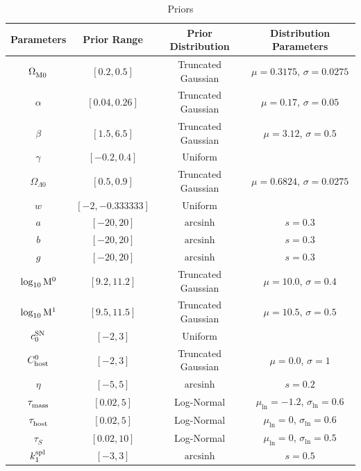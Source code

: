 \begin{table}
    \caption{Priors}
    \label{tab:priors}
    \centering
    \begin{tabular}{cccc}
        \hline
        \hline
        Parameters & Prior Range & Prior Distribution & Distribution Parameters \\
        \hline
        \hline
        $\Omega_{\rm M0}^{}$ & $[0.2, 0.5]$ & Truncated Gaussian & $\mu = 0.3175$, $\sigma = 0.0275$ \\
        $\alpha$ & $[0.04, 0.26]$ & Truncated Gaussian & $\mu = 0.17$, $\sigma = 0.05$ \\
        $\beta$ & $[1.5, 6.5]$ & Truncated Gaussian & $\mu = 3.12$, $\sigma = 0.5$ \\
        $\gamma$ & $[-0.2, 0.4]$ & Uniform &  \\
        \hline
        $\Omega_{\Lambda 0}^{}$ & $[0.5, 0.9]$ & Truncated Gaussian & $\mu = 0.6824$, $\sigma = 0.0275$ \\
        $w$ & $[-2, -0.333333]$ & Uniform &  \\
        \hline
        $a$ & $[-20, 20]$ & $\mathrm{arcsinh}$ & $s = 0.3$ \\
        $b$ & $[-20, 20]$ & $\mathrm{arcsinh}$ & $s = 0.3$ \\
        $g$ & $[-20, 20]$ & $\mathrm{arcsinh}$ & $s = 0.3$ \\
        \hline
        $\log_{10}^{}{\rm M}^0$ & $[9.2, 11.2]$ & Truncated Gaussian & $\mu = 10.0$, $\sigma = 0.4$ \\
        $\log_{10}^{}{\rm M}^1$ & $[9.5, 11.5]$ & Truncated Gaussian & $\mu = 10.5$, $\sigma = 0.5$ \\
        $c_0^{\rm SN}$ & $[-2, 3]$ & Uniform &  \\
        $C_{\rm host}^{0}$ & $[-2, 3]$ & Truncated Gaussian & $\mu = 0.0$, $\sigma = 1$ \\
        $\eta$ & $[-5, 5]$ & $\mathrm{arcsinh}$ & $s = 0.2$ \\
        \hline
        $\tau_{\rm mass}^{}$ & $[0.02, 5]$ & Log-Normal & $\mu_{\ln}^{} = -1.2$, $\sigma_{\ln}^{} = 0.6$ \\
        $\tau_{\rm host}^{}$ & $[0.02, 5]$ & Log-Normal & $\mu_{\ln}^{} = 0$, $\sigma_{\ln}^{} = 0.6$ \\
        $\tau_S^{}$ & $[0.02, 10]$ & Log-Normal & $\mu_{\ln}^{} = 0$, $\sigma_{\ln}^{} = 0.5$ \\
        \hline
        $k_1^{\rm spl}$ & $[-3, 3]$ & $\mathrm{arcsinh}$ & $s = 0.5$ \\

\end{tabular}
\end{table}
